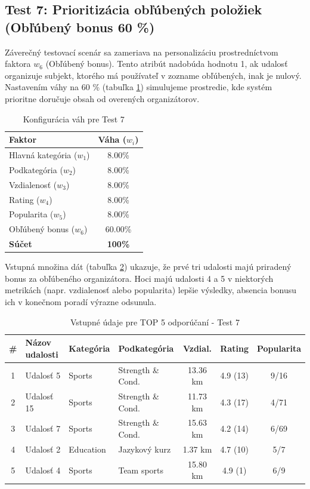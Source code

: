 \documentclass[12pt,a4paper]{article}
\begin{document}
\subsection{Test 7: Prioritizácia obľúbených položiek (Obľúbený bonus 60 \%)}

Záverečný testovací scenár sa zameriava na personalizáciu prostredníctvom faktora $w_6$ (Obľúbený bonus). Tento atribút nadobúda hodnotu 1, ak udalosť organizuje subjekt, ktorého má používateľ v zozname obľúbených, inak je nulový. Nastavením váhy na 60 \% (tabuľka \ref{tab:vahy_test7}) simulujeme prostredie, kde systém prioritne doručuje obsah od overených organizátorov.

\begin{table}[H]
\centering
\begin{tabular}{|l|c|}
\hline
\textbf{Faktor} & \textbf{Váha ($w_i$)} \\
\hline
Hlavná kategória ($w_1$) & 8.00\% \\
Podkategória ($w_2$) & 8.00\% \\
Vzdialenosť ($w_3$) & 8.00\% \\
Rating ($w_4$) & 8.00\% \\
Popularita ($w_5$) & 8.00\% \\
Obľúbený bonus ($w_6$) & 60.00\% \\
\hline
\textbf{Súčet} & \textbf{100\%} \\
\hline
\end{tabular}
\caption{Konfigurácia váh pre Test 7}
\label{tab:vahy_test7}
\end{table}

Vstupná množina dát (tabuľka \ref{tab:data_test7}) ukazuje, že prvé tri udalosti majú priradený bonus za obľúbeného organizátora. Hoci majú udalosti 4 a 5 v niektorých metrikách (napr. vzdialenosť alebo popularita) lepšie výsledky, absencia bonusu ich v konečnom poradí výrazne odsunula.

\begin{table}[H]
\centering
\small
\begin{tabular}{|c|l|l|l|c|c|c|}
\hline
\textbf{\#} & \textbf{Názov udalosti} & \textbf{Kategória} & \textbf{Podkategória} & \textbf{Vzdial.} & \textbf{Rating} & \textbf{Popularita} \\
\hline
1 & Udalosť 5  & Sports    & Strength \& Cond. & 13.36 km & 4.9 (13) & 9/16 \\
2 & Udalosť 15 & Sports    & Strength \& Cond. & 11.73 km & 4.3 (17) & 4/71 \\
3 & Udalosť 7  & Sports    & Strength \& Cond. & 15.63 km & 4.2 (14) & 6/69 \\
4 & Udalosť 2  & Education & Jazykový kurz     & 1.37 km  & 4.7 (10) & 5/7 \\
5 & Udalosť 4  & Sports    & Team sports       & 15.80 km & 4.9 (1)  & 6/9 \\
\hline
\end{tabular}
\caption{Vstupné údaje pre TOP 5 odporúčaní - Test 7}
\label{tab:data_test7}
\end{table}
\end{document}
